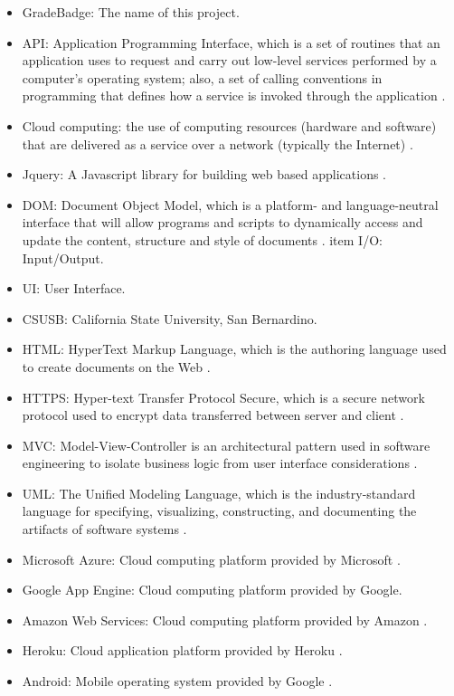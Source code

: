\begin{itemize}
\item GradeBadge: The name of this project.
\item API: Application Programming Interface, which is a set of routines that an application uses to request and carry out low-level services performed by a computer's operating system; also, a set of calling conventions in programming that defines how a service is invoked through the application \cite{API}.
\item Cloud computing: the use of computing resources (hardware and software) that are delivered as a service over a network (typically the Internet) \cite{cloudcomputing}.
\item Jquery: A Javascript library for building web based applications \cite{JQuery}.
\item DOM: Document Object Model, which is a platform- and language-neutral interface that will allow programs and scripts to dynamically access and update the content, structure and style of documents \cite{DOM}.
item I/O: Input/Output.
\item UI: User Interface.
\item CSUSB: California State University, San Bernardino.
\item HTML: HyperText Markup Language, which is the authoring language used to create documents on the Web \cite{w3}.
\item HTTPS: Hyper-text Transfer Protocol Secure, which is a secure network protocol used to encrypt data transferred  between server and client \cite{https}.
\item MVC\label{def:mvc}: Model-View-Controller is an architectural pattern used in software engineering to isolate business logic from user interface considerations \cite{MVC}.
\item UML: The Unified Modeling Language, which is the industry-standard language for specifying, visualizing, constructing, and documenting the artifacts of software systems \cite{uml}.
\item Microsoft Azure: Cloud computing platform provided by Microsoft \cite{MicrosoftAzure}.
\item Google App Engine: Cloud computing platform provided by Google.
\item Amazon Web Services: Cloud computing platform provided by Amazon \cite{AWS}.
\item Heroku: Cloud application platform provided by Heroku \cite{Heroku}.
\item Android: Mobile operating system provided by Google \cite{Android}.

\end{itemize}
